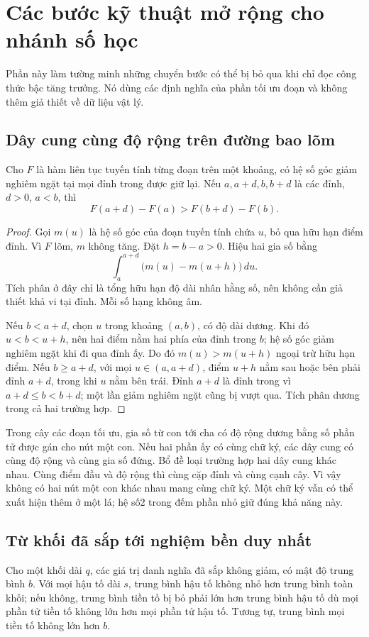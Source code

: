 \section{Các bước kỹ thuật mở rộng cho nhánh số học}\label{app:arithproof}
Phần này làm tường minh những chuyển bước có thể bị bỏ qua khi chỉ đọc công thức bậc tăng trưởng. Nó dùng các định nghĩa của phần tối ưu đoạn và không thêm giả thiết về dữ liệu vật lý.

\subsection{Dây cung cùng độ rộng trên đường bao lõm}
\begin{lemma}\label{lem:chorddetail}
Cho $F$ là hàm liên tục tuyến tính từng đoạn trên một khoảng, có hệ số góc giảm nghiêm ngặt tại mọi đỉnh trong được giữ lại. Nếu $a,a+d,b,b+d$ là các đỉnh, $d>0$, $a<b$, thì
\[
F(a+d)-F(a)>F(b+d)-F(b).
\]
\end{lemma}
\begin{proof}
Gọi $m(u)$ là hệ số góc của đoạn tuyến tính chứa $u$, bỏ qua hữu hạn điểm đỉnh. Vì $F$ lõm, $m$ không tăng. Đặt $h=b-a>0$. Hiệu hai gia số bằng
\[
\int_a^{a+d}\bigl(m(u)-m(u+h)\bigr)\,du.
\]
Tích phân ở đây chỉ là tổng hữu hạn độ dài nhân hằng số, nên không cần giả thiết khả vi tại đỉnh. Mỗi số hạng không âm.

Nếu $b<a+d$, chọn $u$ trong khoảng $(a,b)$, có độ dài dương. Khi đó $u<b<u+h$, nên hai điểm nằm hai phía của đỉnh trong $b$; hệ số góc giảm nghiêm ngặt khi đi qua đỉnh ấy. Do đó $m(u)>m(u+h)$ ngoại trừ hữu hạn điểm. Nếu $b\ge a+d$, với mọi $u\in(a,a+d)$, điểm $u+h$ nằm sau hoặc bên phải đỉnh $a+d$, trong khi $u$ nằm bên trái. Đỉnh $a+d$ là đỉnh trong vì $a+d\le b<b+d$; một lần giảm nghiêm ngặt cũng bị vượt qua. Tích phân dương trong cả hai trường hợp.
\end{proof}
Trong cây các đoạn tối ưu, gia số từ con tới cha có độ rộng dương bằng số phần tử được gán cho nút một con. Nếu hai phần ấy có cùng chữ ký, các dây cung có cùng độ rộng và cùng gia số đứng. Bổ đề loại trường hợp hai dây cung khác nhau. Cùng điểm đầu và độ rộng thì cùng cặp đỉnh và cùng cạnh cây. Vì vậy không có hai nút một con khác nhau mang cùng chữ ký. Một chữ ký vẫn có thể xuất hiện thêm ở một lá; hệ số2 trong đếm phần nhỏ giữ đúng khả năng này.

\subsection{Từ khối đã sắp tới nghiệm bền duy nhất}
Cho một khối dài $q$, các giá trị danh nghĩa đã sắp không giảm, có mật độ trung bình $b$. Với mọi hậu tố dài $s$, trung bình hậu tố không nhỏ hơn trung bình toàn khối; nếu không, trung bình tiền tố bị bỏ phải lớn hơn trung bình hậu tố dù mọi phần tử tiền tố không lớn hơn mọi phần tử hậu tố. Tương tự, trung bình mọi tiền tố không lớn hơn $b$.

